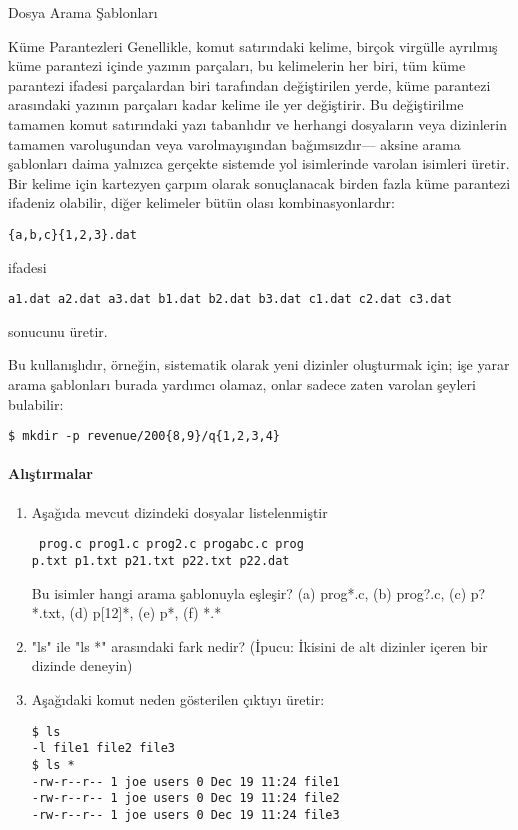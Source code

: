 \begin{section}{Dosya Arama Şablonları}
\begin{subsection}{Küme Parantezleri}
Genellikle, komut satırındaki kelime, birçok virgülle ayrılmış küme parantezi içinde yazının parçaları, bu kelimelerin her biri, tüm küme parantezi ifadesi parçalardan biri tarafından değiştirilen yerde, küme parantezi arasındaki yazının parçaları kadar kelime ile yer değiştirir. Bu değiştirilme tamamen komut satırındaki yazı tabanlıdır ve herhangi dosyaların veya dizinlerin tamamen varoluşundan veya varolmayışından bağımsızdır— aksine arama şablonları daima yalnızca gerçekte sistemde yol isimlerinde varolan isimleri üretir.
Bir kelime için kartezyen çarpım olarak sonuçlanacak birden fazla küme parantezi ifadeniz olabilir, diğer kelimeler bütün olası kombinasyonlardır:
\begin{verbatim}
{a,b,c}{1,2,3}.dat
\end{verbatim}
ifadesi
\begin{verbatim}
a1.dat a2.dat a3.dat b1.dat b2.dat b3.dat c1.dat c2.dat c3.dat
\end{verbatim}
sonucunu üretir.

Bu kullanışlıdır, örneğin, sistematik olarak yeni dizinler oluşturmak için; işe yarar arama şablonları burada yardımcı olamaz, onlar sadece zaten varolan şeyleri bulabilir:
\begin{verbatim}
$ mkdir -p revenue/200{8,9}/q{1,2,3,4}
\end{verbatim}
\paragraph{{\Huge{\PencilLeftDown}}Alıştırmalar}{
\begin{enumerate}
 \item Aşağıda mevcut dizindeki dosyalar listelenmiştir\begin{verbatim}
 prog.c prog1.c prog2.c progabc.c prog
p.txt p1.txt p21.txt p22.txt p22.dat
 \end{verbatim}Bu isimler hangi arama şablonuyla eşleşir? (a) prog*.c, (b) prog?.c, (c) p?*.txt, (d) p[12]*, (e) p*, (f) *.*
 \item "ls" ile "ls *" arasındaki fark nedir? (İpucu: İkisini de alt dizinler içeren bir dizinde deneyin)
 \item Aşağıdaki komut neden gösterilen çıktıyı üretir:\begin{verbatim}
$ ls
-l file1 file2 file3
$ ls *
-rw-r--r-- 1 joe users 0 Dec 19 11:24 file1
-rw-r--r-- 1 joe users 0 Dec 19 11:24 file2
-rw-r--r-- 1 joe users 0 Dec 19 11:24 file3
 \end{verbatim}
\end{enumerate}}

\end{subsection}
\end{section}
